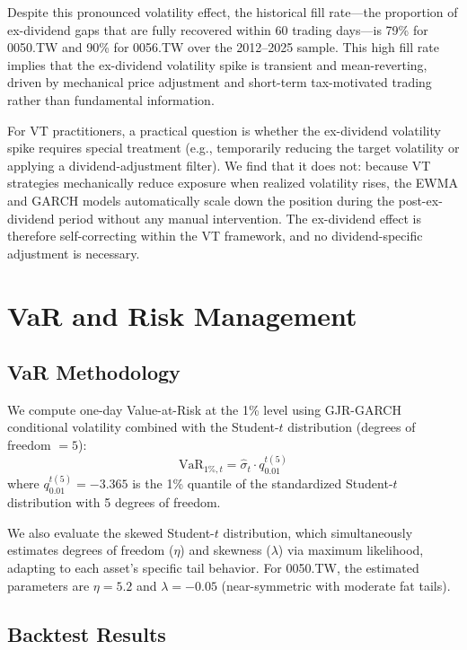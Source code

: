 Despite this pronounced volatility effect, the historical fill rate---the proportion of ex-dividend gaps that are fully recovered within 60 trading days---is 79\% for 0050.TW and 90\% for 0056.TW over the 2012--2025 sample. This high fill rate implies that the ex-dividend volatility spike is transient and mean-reverting, driven by mechanical price adjustment and short-term tax-motivated trading rather than fundamental information.

For VT practitioners, a practical question is whether the ex-dividend volatility spike requires special treatment (e.g., temporarily reducing the target volatility or applying a dividend-adjustment filter). We find that it does not: because VT strategies mechanically reduce exposure when realized volatility rises, the EWMA and GARCH models automatically scale down the position during the post-ex-dividend period without any manual intervention. The ex-dividend effect is therefore self-correcting within the VT framework, and no dividend-specific adjustment is necessary.



\section{VaR and Risk Management}
\label{sec:var}

\subsection{VaR Methodology}

We compute one-day Value-at-Risk at the 1\% level using GJR-GARCH conditional volatility combined with the Student-$t$ distribution (degrees of freedom $= 5$):
\begin{equation}
\text{VaR}_{1\%,t} = \hat{\sigma}_t \cdot q_{0.01}^{t(5)}
\label{eq:var}
\end{equation}
where $q_{0.01}^{t(5)} = -3.365$ is the 1\% quantile of the standardized Student-$t$ distribution with 5 degrees of freedom.

We also evaluate the skewed Student-$t$ distribution, which simultaneously estimates degrees of freedom ($\eta$) and skewness ($\lambda$) via maximum likelihood, adapting to each asset's specific tail behavior. For 0050.TW, the estimated parameters are $\eta = 5.2$ and $\lambda = -0.05$ (near-symmetric with moderate fat tails).

\subsection{Backtest Results}

